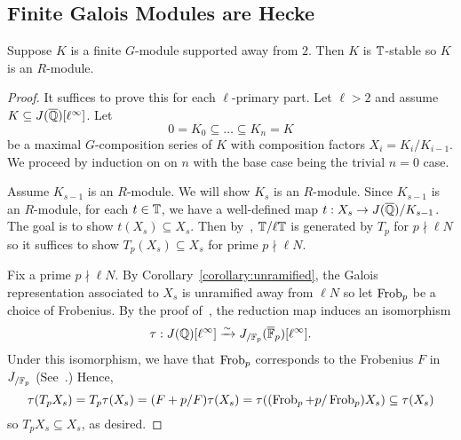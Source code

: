 \documentclass{article}
\begin{document}
\subsection{Finite Galois Modules are Hecke}

\begin{theorem}\label{theorem:G_modules_are_Hecke}
    Suppose $K$ is a finite $G$-module supported away from $2$. Then $K$ is
    $\mathbb{T}$-stable so $K$ is an $R$-module.
\end{theorem}
\begin{proof}
    It suffices to prove this for each $\ell$-primary part. Let $\ell>2$ and
    assume $K\subseteq J(\overline{\mathbb{Q}})[\ell^\infty]$. Let
    \[
        0 = K_0 \subseteq \ldots \subseteq K_n = K
    \]
    be a maximal $G$-composition series of $K$ with composition factors $X_i =
    K_i/K_{i-1}$. We proceed by induction on on $n$ with the base
    case being the trivial $n=0$ case. 
    
    Assume $K_{s-1}$ is an $R$-module. We will show $K_s$ is an $R$-module.
    Since $K_{s-1}$ is an $R$-module, for each $t\in \mathbb{T}$, we have a
    well-defined map $t:X_s\to J(\overline{\mathbb{Q}})/K_{s-1}$. The goal is to show
    $t(X_s)\subseteq X_s$. Then by~\cite[Prop. 6.1]{MR1610883}, $\mathbb{T}/\ell \mathbb{T}$
    is generated by $T_p$ for $p\nmid \ell N$ so it suffices to show
    $T_p(X_s)\subseteq X_s$ for prime $p\nmid \ell N$.

    Fix a prime $p\nmid \ell N$. By Corollary~\ref{corollary:unramified}, the
    Galois representation associated to $X_s$ is unramified away from $\ell N$
    so let $\operatorname{Frob}_p$ be a choice of Frobenius. By the proof of~\cite[Lemma
    12.6.2]{ribet-stein:mod}, the reduction map induces an isomorphism
    \[
        \tau:J(\mathbb{Q})[\ell^\infty] \xrightarrow{\sim} J_{/\mathbb{F}_p} (\overline{\mathbb{F}}_p)[\ell^\infty].
    \]
    Under this isomorphism, we have that $\operatorname{Frob}_p$ corresponds to the Frobenius
    $F$ in $J_{/\mathbb{F}_p}$ (See~\cite[\S 5.3]{ribet-stein:serre}.) Hence,
    \[
    \tau(T_p X_s) 
    = T_p\tau(X_s) 
    = (F+p/F)\tau(X_s)
    = \tau((\operatorname{Frob}_p+p/\operatorname{Frob}_p)X_s)
    \subseteq \tau(X_s)
    \]
    so $T_p X_s\subseteq X_s$, as desired.
\end{proof}
\end{document}
